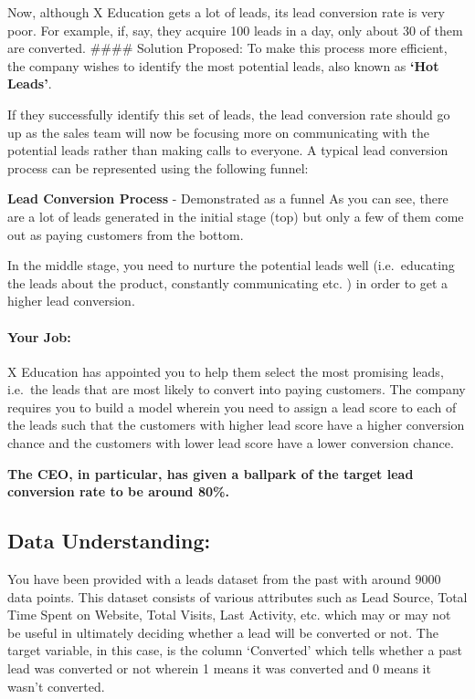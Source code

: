 \documentclass[11pt]{article}
\begin{document}
Now, although X Education gets a lot of leads, its lead conversion rate
is very poor. For example, if, say, they acquire 100 leads in a day,
only about 30 of them are converted. \#\#\#\# Solution Proposed: To make
this process more efficient, the company wishes to identify the most
potential leads, also known as \textbf{`Hot Leads'}.

If they successfully identify this set of leads, the lead conversion
rate should go up as the sales team will now be focusing more on
communicating with the potential leads rather than making calls to
everyone. A typical lead conversion process can be represented using the
following funnel:

\textbf{Lead Conversion Process} - Demonstrated as a funnel As you can
see, there are a lot of leads generated in the initial stage (top) but
only a few of them come out as paying customers from the bottom.

In the middle stage, you need to nurture the potential leads well
(i.e.~educating the leads about the product, constantly communicating
etc. ) in order to get a higher lead conversion.

\hypertarget{your-job}{%
\paragraph{Your Job:}\label{your-job}}

X Education has appointed you to help them select the most promising
leads, i.e.~the leads that are most likely to convert into paying
customers. The company requires you to build a model wherein you need to
assign a lead score to each of the leads such that the customers with
higher lead score have a higher conversion chance and the customers with
lower lead score have a lower conversion chance.

\textbf{The CEO, in particular, has given a ballpark of the target lead
conversion rate to be around 80\%.}

\hypertarget{data-understanding}{%
\subsection{Data Understanding:}\label{data-understanding}}

You have been provided with a leads dataset from the past with around
9000 data points. This dataset consists of various attributes such as
Lead Source, Total Time Spent on Website, Total Visits, Last Activity,
etc. which may or may not be useful in ultimately deciding whether a
lead will be converted or not. The target variable, in this case, is the
column `Converted' which tells whether a past lead was converted or not
wherein 1 means it was converted and 0 means it wasn't converted.
\end{document}
